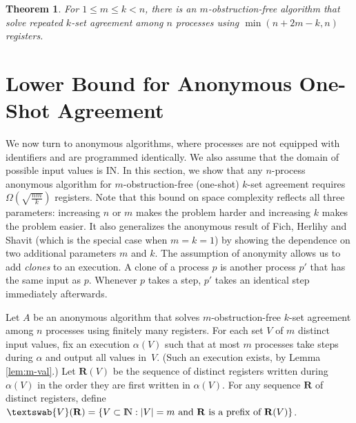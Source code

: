 \documentclass[11pt]{article}
\newtheorem{theorem}{Theorem}
\newcommand{\journalversion}[1]{}
\newcommand{\gV}{\textswab{V}}
\newcommand{\bR}{\mathbf{R}}
\newcommand{\nat}{{\rm I\!N}}
\newcounter{ind}
\begin{document}
\begin{theorem}
\label{thm:repeated-alg}
For $1\leq m\leq k <n$, there is an $m$-obstruction-free algorithm that solve repeated  $k$-set agreement 
among $n$ processes using $\min(n+2m-k,n)$ registers.
\end{theorem}




 


\section{Lower Bound for Anonymous
One-Shot Agreement}
\label{m-conc-lower-sec}
\indent

We now turn to anonymous algorithms, where processes are not equipped with identifiers and are programmed identically.
We also assume that the domain of possible input values is \nat.
In this section, we show that any $n$-process anonymous algorithm for $m$-obstruction-free (one-shot) $k$-set agreement requires $\Omega(\sqrt{\frac{nm}{k}})$ registers.  
Note that this bound on space complexity reflects all three parameters:  increasing $n$ or $m$ makes the problem harder
and increasing $k$ makes the problem easier.
It also generalizes the anonymous result of Fich, Herlihy and Shavit \cite{FHS98} (which is the special case when $m=k=1$) by showing  the
dependence on two additional parameters $m$ and $k$.
The assumption of anonymity allows us to add {\it clones} to an execution.  A clone of a process $p$ is another process $p'$ that has the same input as $p$.  Whenever $p$ takes a step, $p'$ takes an identical step immediately afterwards.





\journalversion{For the journal version, we should see just how big the domain of possible values has to be to make the lower bound work.  It should work for exponential size domains.
See paper:  The minimum number of disjoint pairs in set systems and related problems by Das, Gan and Sudakov (which cites Erdos-Ko-Rado theorem of 1961 that might be useful).
In fact, the lower bound might even hold if the input domain has size n.
}

Let $A$ be an anonymous algorithm that solves $m$-obstruction-free $k$-set agreement among $n$ processes using finitely many registers.
For each set $V$  of $m$ distinct input values, fix an execution $\alpha(V)$ such that at most $m$ processes take steps during $\alpha$ and output
all values in~$V$.  (Such an execution exists, by Lemma \ref{lem:m-val}.)
Let $\bR(V)$  be the sequence of distinct registers written during
$\alpha(V)$ in the order they are first written in $\alpha(V)$.
For any sequence $\bR$ of distinct registers, define 
$\gV(\bR) = \{V \subset \nat : |V|=m \mbox{ and }\bR \mbox{ is a prefix of } \bR(V)\}$.
\end{document}
